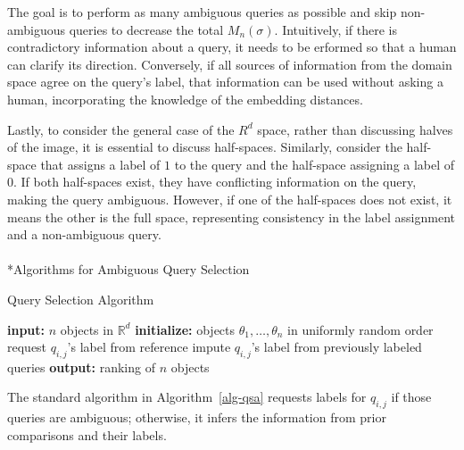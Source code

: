 \documentclass[
  letterpaper,
  numbers=noenddot,
  DIV=11]{scrreprt}
\makeatletter
\let\oldparagraph\paragraph
\renewcommand{\paragraph}{
    \@ifstar
      \xxxParagraphStar
      \xxxParagraphNoStar
  }
\newcommand{\xxxParagraphStar}[1]{\oldparagraph*{#1}\mbox{}}
\newcommand{\xxxParagraphNoStar}[1]{\oldparagraph{#1}\mbox{}}
\theoremstyle{plain}
\theoremstyle{definition}
\theoremstyle{plain}
\theoremstyle{remark}
\makeatother
\begin{document}
The goal is to perform as many ambiguous queries as possible and skip
non-ambiguous queries to decrease the total \(M_n(\sigma)\).
Intuitively, if there is contradictory information about a query, it
needs to be erformed so that a human can clarify its direction.
Conversely, if all sources of information from the domain space agree on
the query's label, that information can be used without asking a human,
incorporating the knowledge of the embedding distances.

Lastly, to consider the general case of the \(R^d\) space, rather than
discussing halves of the image, it is essential to discuss half-spaces.
Similarly, consider the half-space that assigns a label of \(1\) to the
query and the half-space assigning a label of \(0\). If both half-spaces
exist, they have conflicting information on the query, making the query
ambiguous. However, if one of the half-spaces does not exist, it means
the other is the full space, representing consistency in the label
assignment and a non-ambiguous query.

\paragraph*{Algorithms for Ambiguous Query
Selection}\label{algorithms-for-ambiguous-query-selection}

\begin{algorithm}[H]
    \caption{Query Selection Algorithm}
    \label{alg-qsa}
\begin{algorithmic}[1]
        \State \textbf{input:} $n$ objects in $\mathbb{R}^d$
        \State \textbf{initialize:} objects $\theta_1, \dots, \theta_n$ in uniformly random order
                    \State request $q_{i,j}$'s label from reference
                \Else
                    \State impute $q_{i,j}$'s label from previously labeled queries
                \EndIf
            \EndFor
        \EndFor
        \State \textbf{output:} ranking of $n$ objects
    \end{algorithmic}
\end{algorithm}

The standard algorithm in  Algorithm~\ref{alg-qsa}  requests labels for
\(q_{i,j}\) if those queries are ambiguous; otherwise, it infers the
information from prior comparisons and their labels.
\end{document}
